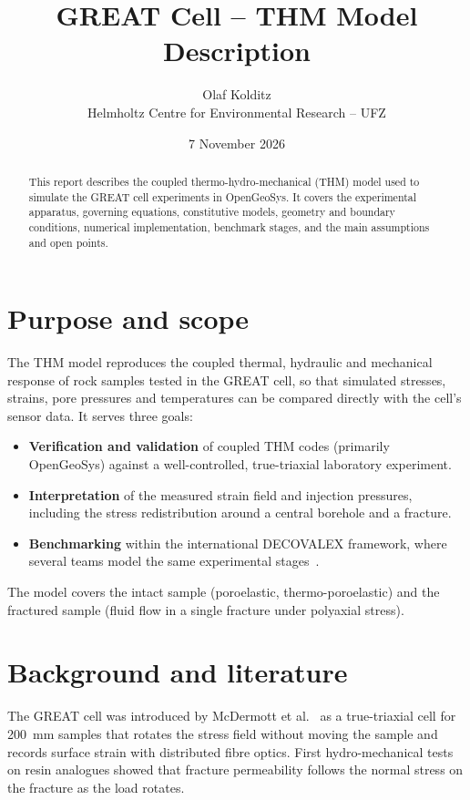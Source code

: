 \documentclass[11pt,a4paper]{article}
\title{GREAT Cell -- THM Model Description}
\author{Olaf Kolditz\\Helmholtz Centre for Environmental Research -- UFZ}
\date{7 November 2026}
\begin{document}
\maketitle

\begin{abstract}
This report describes the coupled thermo-hydro-mechanical (THM) model used to
simulate the GREAT cell experiments in OpenGeoSys. It covers the experimental
apparatus, governing equations, constitutive models, geometry and boundary
conditions, numerical implementation, benchmark stages, and the main
assumptions and open points.
\end{abstract}

\tableofcontents

\section{Purpose and scope}
The THM model reproduces the coupled thermal, hydraulic and mechanical response
of rock samples tested in the GREAT cell, so that simulated stresses, strains,
pore pressures and temperatures can be compared directly with the cell's sensor
data. It serves three goals:
\begin{itemize}
  \item \textbf{Verification and validation} of coupled THM codes (primarily
        OpenGeoSys) against a well-controlled, true-triaxial laboratory experiment.
  \item \textbf{Interpretation} of the measured strain field and injection
        pressures, including the stress redistribution around a central borehole
        and a fracture.
  \item \textbf{Benchmarking} within the international DECOVALEX framework,
        where several teams model the same experimental stages~\cite{UFZDecovalex2023}.
\end{itemize}
The model covers the intact sample (poroelastic, thermo-poroelastic) and the
fractured sample (fluid flow in a single fracture under polyaxial stress).

\section{Background and literature}
The GREAT cell was introduced by McDermott et al.~\cite{McDermott2018} as a
true-triaxial cell for \SI{200}{mm} samples that rotates the stress field
without moving the sample and records surface strain with distributed fibre
optics. First hydro-mechanical tests on resin analogues showed that fracture
permeability follows the normal stress on the fracture as the load rotates.
\end{document}
